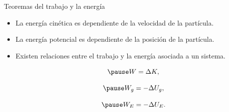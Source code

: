     \begin{frame}{Teoremas del trabajo y la energía}
        \begin{itemize}
            \pause \item La energía cinética es dependiente de la velocidad de la partícula.
            
            \pause \item La energía potencial es dependiente de la posición de la partícula.
            
            \pause \item Existen relaciones entre el trabajo y la energía asociada a un sistema.
            
            \begin{equation}
             \pause    W=\Delta K,
            \end{equation}
            
            \begin{equation}
             \pause    W_g=-\Delta U_g,
            \end{equation}
            
            \begin{equation}
             \pause    W_E=-\Delta U_E.
            \end{equation}
            
        \end{itemize}
        
    \end{frame}
    
    
